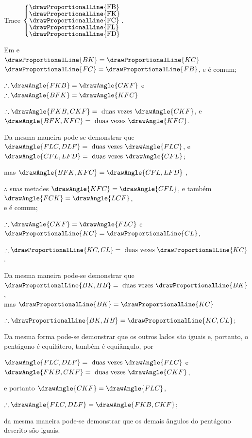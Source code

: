 \documentclass[booklanguage=brazilian]{byrnebook}
\begin{document}
\begin{center}
Trace
$\left\{\vcenter{
\nointerlineskip\hbox{\drawProportionalLine{FB}}
\nointerlineskip\hbox{\drawProportionalLine{FK}}
\nointerlineskip\hbox{\drawProportionalLine{FC}}
\nointerlineskip\hbox{\drawProportionalLine{FL}}
\nointerlineskip\hbox{\drawProportionalLine{FD}}
}\right.$.

Em  e \\
$\drawProportionalLine{BK} = \drawProportionalLine{KC}$  \\
$\drawProportionalLine{FC} = \drawProportionalLine{FB}$, e  é comum;

$\therefore \drawAngle{FKB} = \drawAngle{CKF}$ e $\therefore \drawAngle{BFK} = \drawAngle{KFC}$ 

$\therefore \drawAngle{FKB,CKF} = \mbox{ duas vezes } \drawAngle{CKF}$, e $\drawAngle{BFK,KFC} = \mbox{ duas vezes } \drawAngle{KFC}$.

Da mesma maneira pode-se demonstrar que\\
$\drawAngle{FLC,DLF} = \mbox{ duas vezes } \drawAngle{FLC}$, e $\drawAngle{CFL,LFD} = \mbox{ duas vezes } \drawAngle{CFL}$;

mas $\drawAngle{BFK,KFC} = \drawAngle{CFL,LFD}$ ,

$\therefore$ suas metades $\drawAngle{KFC} = \drawAngle{CFL}$, e também $\drawAngle{FCK} = \drawAngle{LCF}$,\\
e  é comum;

$\therefore \drawAngle{CKF} = \drawAngle{FLC}$ e $\drawProportionalLine{KC} = \drawProportionalLine{CL}$,

$\therefore \drawProportionalLine{KC,CL} = \mbox{ duas vezes } \drawProportionalLine{KC}$.

Da mesma maneira pode-se demonstrar que $\drawProportionalLine{BK,HB} = \mbox{ duas vezes } \drawProportionalLine{BK}$,\\
mas $\drawProportionalLine{BK} = \drawProportionalLine{KC}$

$\therefore \drawProportionalLine{BK,HB} = \drawProportionalLine{KC,CL}$;
\end{center}

Da mesma forma pode-se demonstrar que os outros lados são iguais e, portanto, o pentágono é equilátero, também é equiângulo, por

\begin{center}
$\drawAngle{FLC,DLF} = \mbox{ duas vezes } \drawAngle{FLC}$ e $\drawAngle{FKB,CKF} = \mbox{ duas vezes } \drawAngle{CKF}$,

e portanto $ \drawAngle{CKF} = \drawAngle{FLC}$,

$\therefore \drawAngle{FLC,DLF} = \drawAngle{FKB,CKF}$;

da mesma maneira pode-se demonstrar que os demais ângulos do pentágono descrito são iguais.
\end{center}
\end{document}
